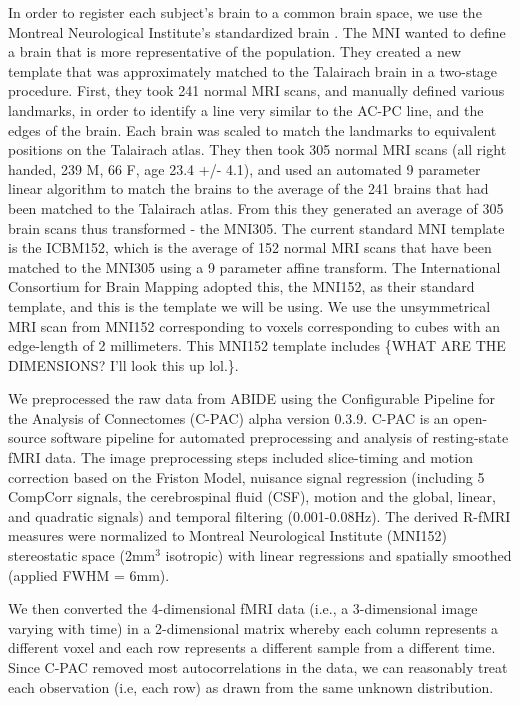 {In order to register each subject's brain to a common brain space, we use the
Montreal Neurological Institute's standardized brain
\citep{evans19933d,collins1994automatic}.
The MNI wanted to define a brain that is more representative of the population.
They created a new template that was approximately matched to the Talairach
brain in a two-stage procedure. First, they took 241 normal MRI scans, and
manually defined various landmarks, in order to identify a line very similar to
the AC-PC line, and the edges of the brain. Each brain was scaled to match the
landmarks to equivalent positions on the Talairach atlas. They then took 305
normal MRI scans (all right handed, 239 M, 66 F, age 23.4 +/- 4.1), and used an
automated 9 parameter linear algorithm to match the brains to the average of the
241 brains that had been matched to the Talairach atlas. From this they
generated an average of 305 brain scans thus transformed - the MNI305.
The current standard MNI template is the ICBM152, which is the average of 152
normal MRI scans  that have been matched to the MNI305 using a 9 parameter
affine transform. The International Consortium for Brain Mapping adopted this,
the MNI152, as their standard template, and this is the template
we will be using. We use the unsymmetrical 
MRI scan from MNI152 corresponding to voxels corresponding to cubes with an
edge-length of 2 millimeters. This MNI152 template includes \{WHAT ARE THE
DIMENSIONS? I'll look this up lol.\}.

We preprocessed the raw data from ABIDE using the Configurable Pipeline for the
Analysis of Connectomes (C-PAC) alpha version 0.3.9.
C-PAC is an open-source software pipeline for automated preprocessing and
analysis of resting-state fMRI data.
The image preprocessing steps
included slice-timing and motion correction based on the Friston Model, nuisance
signal
regression (including 5 CompCorr signals, the cerebrospinal fluid (CSF), motion
 and the global, linear, and quadratic
signals) and temporal filtering (0.001-0.08Hz). The derived R-fMRI measures
were normalized to Montreal Neurological Institute (MNI152) stereostatic
space (2mm$^3$ isotropic) with linear regressions and spatially smoothed
(applied FWHM = 6mm). 

We then converted the 4-dimensional fMRI data (i.e., a 3-dimensional image
varying with time) in a 2-dimensional matrix
whereby each column represents a different voxel and each row represents a
different sample from a different time. Since C-PAC
removed most autocorrelations in the data, we can reasonably treat each
observation (i.e, each row) as drawn from the same 
unknown distribution.
}

